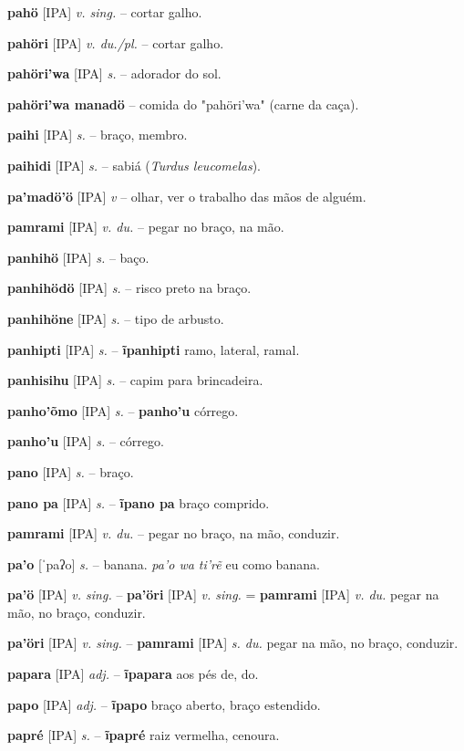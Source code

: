 \textbf{pahö} [IPA] \textit{v. sing.} -- cortar galho.

\textbf{pahöri} [IPA] \textit{v. du./pl.} -- cortar galho.

\textbf{pahöri'wa} [IPA] \textit{s.} -- adorador do sol.

\textbf{pahöri'wa manadö} -- comida do "pahöri'wa" (carne da caça).

\textbf{paihi} [IPA] \textit{s.} -- braço, membro.

\textbf{paihidi} [IPA] \textit{s.} -- sabiá (\textit{Turdus leucomelas}).

\textbf{pa'madö'ö} [IPA] \textit{v} -- olhar, ver o trabalho das mãos de alguém.

\textbf{pamrami} [IPA] \textit{v. du.} -- pegar no braço, na mão.

\textbf{panhihö} [IPA] \textit{s.} -- baço.

\textbf{panhihödö} [IPA] \textit{s.} -- risco preto na braço.

\textbf{panhihöne} [IPA] \textit{s.} -- tipo de arbusto.

\textbf{panhipti} [IPA] \textit{s.} -- \textbf{ĩpanhipti} ramo, lateral, ramal.

\textbf{panhisihu} [IPA] \textit{s.} -- capim para brincadeira.

\textbf{panho'õmo} [IPA] \textit{s.} -- \textbf{panho'u} córrego.

\textbf{panho'u} [IPA] \textit{s.} -- córrego.

\textbf{pano} [IPA] \textit{s.} -- braço.

\textbf{pano pa} [IPA] \textit{s.} -- \textbf{ĩpano pa} braço comprido.

\textbf{pamrami} [IPA] \textit{v. du.} -- pegar no braço, na mão, conduzir.

\textbf{pa'o} [ˈpaʔo] \textit{s.} -- banana. \textit{pa'o wa ti'rẽ} eu como banana.

\textbf{pa'ö} [IPA] \textit{v. sing.} -- \textbf{pa'öri} [IPA] \textit{v. sing.} = \textbf{pamrami} [IPA] \textit{v. du.} pegar na mão, no braço, conduzir.

\textbf{pa'öri} [IPA] \textit{v. sing.} -- \textbf{pamrami} [IPA] \textit{s. du.} pegar na mão, no braço, conduzir.

\textbf{papara} [IPA] \textit{adj.} -- \textbf{ĩpapara} aos pés de, do.

\textbf{papo} [IPA] \textit{adj.} -- \textbf{ĩpapo} braço aberto, braço estendido.

\textbf{papré} [IPA] \textit{s.} -- \textbf{ĩpapré} raiz vermelha, cenoura.

